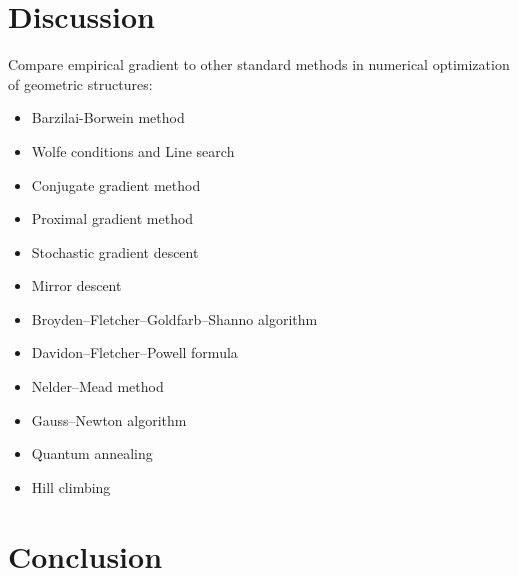 \documentclass{article}
\begin{document}
    \section{Discussion}
        Compare empirical gradient to other standard methods in numerical optimization of geometric structures:
        \begin{itemize}
            \item Barzilai-Borwein method
            \item Wolfe conditions and Line search
            \item Conjugate gradient method
            \item Proximal gradient method
            \item Stochastic gradient descent
            \item Mirror descent
            \item Broyden–Fletcher–Goldfarb–Shanno algorithm
            \item Davidon–Fletcher–Powell formula
            \item Nelder–Mead method
            \item Gauss–Newton algorithm
            \item Quantum annealing
            \item Hill climbing
        \end{itemize}

    \section{Conclusion}
\end{document}
